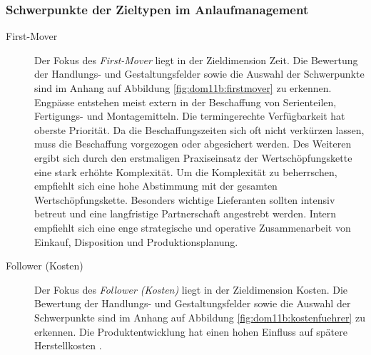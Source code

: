 \subsubsection{Schwerpunkte der Zieltypen im Anlaufmanagement}

\begin{description}
\item[First-Mover] Der Fokus des \textit{First-Mover} liegt in der Zieldimension Zeit. 
Die Bewertung der Handlungs- und Gestaltungsfelder sowie die Auswahl der Schwerpunkte sind im Anhang auf Abbildung \ref{fig:dom11b:firstmover} zu erkennen. 
%
Engpässe entstehen meist extern in der Beschaffung von Serienteilen, Fertigungs- und Montagemitteln. Die termingerechte Verfügbarkeit hat oberste Priorität. Da die Beschaffungszeiten sich oft nicht verkürzen lassen, muss die Beschaffung vorgezogen oder abgesichert werden. 
Des Weiteren ergibt sich durch den erstmaligen Praxiseinsatz der Wertschöpfungskette eine stark erhöhte Komplexität. Um die Komplexität zu beherrschen, empfiehlt sich eine hohe Abstimmung mit der gesamten Wertschöpfungskette. 
Besonders wichtige Lieferanten sollten intensiv betreut und eine langfristige Partnerschaft angestrebt werden. 
Intern empfiehlt sich eine enge strategische und operative Zusammenarbeit von Einkauf, Disposition und Produktionsplanung. 

\item[Follower (Kosten)] Der Fokus des \textit{Follower (Kosten)} liegt in der Zieldimension Kosten. 
Die Bewertung der Handlungs- und Gestaltungsfelder sowie die Auswahl der Schwerpunkte sind im Anhang auf Abbildung \ref{fig:dom11b:kostenfuehrer} zu erkennen. 
%
Die Produktentwicklung hat einen hohen Einfluss auf spätere Herstellkosten \autocite[14]{Ehrlenspiel2014}. 


\end{description}
